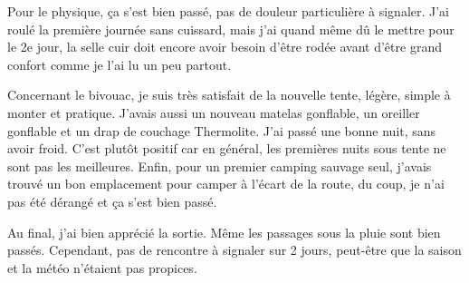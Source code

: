  Pour le physique, ça s'est bien passé, pas de douleur particulière à signaler. J'ai roulé la première journée sans cuissard, mais j'ai quand même dû le mettre pour le 2e jour, la selle cuir doit encore avoir besoin d'être rodée avant d'être grand confort comme je l'ai lu un peu partout.

 Concernant le bivouac, je suis très satisfait de la nouvelle tente, légère, simple à monter et pratique. J'avais aussi un nouveau matelas gonflable, un oreiller gonflable et un drap de couchage Thermolite. J'ai passé une bonne nuit, sans avoir froid. C'est plutôt positif car en général, les premières nuits sous tente ne sont pas les meilleures. Enfin, pour un premier camping sauvage seul, j'avais trouvé un bon emplacement pour camper à l'écart de la route, du coup, je n'ai pas été dérangé et ça s'est bien passé.

 Au final, j'ai bien apprécié la sortie. Même les passages sous la pluie sont bien passés. Cependant, pas de rencontre à signaler sur 2 jours, peut-être que la saison et la météo n'étaient pas propices.


 
 
